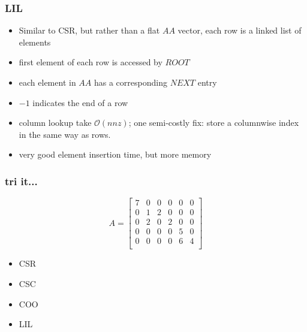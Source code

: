 \documentclass[10pt]{beamer}
\newcommand{\mO}{{\mathcal{O}}}
\begin{document}
\begin{frame}
\frametitle{LIL}
  \begin{itemize}
  \item Similar to CSR, but rather than a flat $AA$ vector, each row is
a linked list of elements
  \item first element of each row is accessed by $ROOT$
  \item each element in $AA$ has a corresponding $NEXT$ entry
  \item $-1$ indicates the end of a row
  \item column lookup take $\mO(nnz)$; one semi-costly fix: store a
columnwise index in the same way as rows.
  \item very good element insertion time, but more memory
  \end{itemize}
\end{frame}
\begin{frame}
\frametitle{tri it...}
    \begin{equation*}
  A = \begin{bmatrix}
  7 & 0 &0 &0 &0 &0\\
  0&1&2 &0&0&0\\
  0&2&0&2&0&0\\
  0&0&0&0&5&0\\
  0&0&0&0&6&4\\
  \end{bmatrix}
\end{equation*}
\begin{itemize} 
    \item CSR
    \item CSC
    \item COO
    \item LIL
\end{itemize} 
\end{frame}
\end{document}
